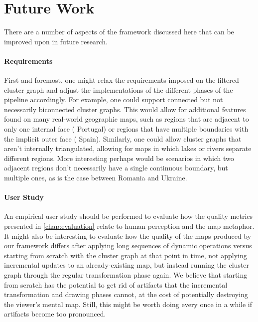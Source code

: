 \section{Future Work}
\label{sect:future-work}

There are a number of aspects of the framework discussed here that can be improved upon in future research.


\paragraph{Requirements}

First and foremost, one might relax the requirements imposed on the filtered cluster graph and adjust the implementations of the different phases of the pipeline accordingly.
For example, one could support connected but not necessarily biconnected cluster graphs.
This would allow for additional features found on many real-world geographic maps, such as regions that are adjacent to only one internal face (\eg{} Portugal) or regions that have multiple boundaries with the implicit outer face (\eg{} Spain).
Similarly, one could allow cluster graphs that aren't internally triangulated, allowing for maps in which lakes or rivers separate different regions.
More interesting perhaps would be scenarios in which two adjacent regions don't necessarily have a single continuous boundary, but multiple ones, as is the case between Romania and Ukraine.


\paragraph{User Study}

An empirical user study should be performed to evaluate how the quality metrics presented in \cref{chap:evaluation} relate to human perception and the map metaphor.
It might also be interesting to evaluate how the quality of the maps produced by our framework differs after applying long sequences of dynamic operations versus starting from scratch with the cluster graph at that point in time, \ie{} not applying incremental updates to an already-existing map, but instead running the cluster graph through the regular transformation phase again.
We believe that starting from scratch has the potential to get rid of artifacts that the incremental transformation and drawing phases cannot, at the cost of potentially destroying the viewer's mental map.
Still, this might be worth doing every once in a while if artifacts become too pronounced.


